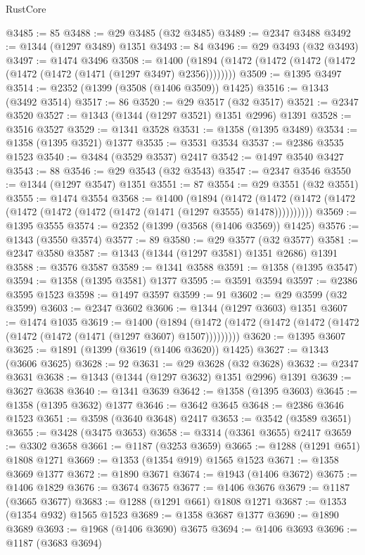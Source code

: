 \begin{lexlean}{RustCore}
\begin{coremodule}
@3485 := 85
@3488 := @29 @3485 (@32 @3485)
@3489 := @2347 @3488
@3492 := @1344 (@1297 @3489) @1351
@3493 := 84
@3496 := @29 @3493 (@32 @3493)
@3497 := @1474 @3496
@3508 := @1400 (@1894 (@1472 (@1472 (@1472 (@1472 (@1472 (@1472 (@1471 (@1297 @3497) @2356))))))))
@3509 := @1395 @3497
@3514 := @2352 (@1399 (@3508 (@1406 @3509)) @1425)
@3516 := @1343 (@3492 @3514)
@3517 := 86
@3520 := @29 @3517 (@32 @3517)
@3521 := @2347 @3520
@3527 := @1343 (@1344 (@1297 @3521) @1351 @2996) @1391
@3528 := @3516 @3527
@3529 := @1341 @3528
@3531 := @1358 (@1395 @3489)
@3534 := @1358 (@1395 @3521) @1377
@3535 := @3531 @3534
@3537 := @2386 @3535 @1523
@3540 := @3484 (@3529 @3537) @2417
@3542 := @1497 @3540 @3427
@3543 := 88
@3546 := @29 @3543 (@32 @3543)
@3547 := @2347 @3546
@3550 := @1344 (@1297 @3547) @1351
@3551 := 87
@3554 := @29 @3551 (@32 @3551)
@3555 := @1474 @3554
@3568 := @1400
    (@1894
      (@1472 (@1472 (@1472 (@1472 (@1472 (@1472 (@1472 (@1472 (@1471 (@1297 @3555) @1478))))))))))
@3569 := @1395 @3555
@3574 := @2352 (@1399 (@3568 (@1406 @3569)) @1425)
@3576 := @1343 (@3550 @3574)
@3577 := 89
@3580 := @29 @3577 (@32 @3577)
@3581 := @2347 @3580
@3587 := @1343 (@1344 (@1297 @3581) @1351 @2686) @1391
@3588 := @3576 @3587
@3589 := @1341 @3588
@3591 := @1358 (@1395 @3547)
@3594 := @1358 (@1395 @3581) @1377
@3595 := @3591 @3594
@3597 := @2386 @3595 @1523
@3598 := @1497 @3597
@3599 := 91
@3602 := @29 @3599 (@32 @3599)
@3603 := @2347 @3602
@3606 := @1344 (@1297 @3603) @1351
@3607 := @1474 @1035
@3619 := @1400
    (@1894 (@1472 (@1472 (@1472 (@1472 (@1472 (@1472 (@1472 (@1471 (@1297 @3607) @1507)))))))))
@3620 := @1395 @3607
@3625 := @1891 (@1399 (@3619 (@1406 @3620)) @1425)
@3627 := @1343 (@3606 @3625)
@3628 := 92
@3631 := @29 @3628 (@32 @3628)
@3632 := @2347 @3631
@3638 := @1343 (@1344 (@1297 @3632) @1351 @2996) @1391
@3639 := @3627 @3638
@3640 := @1341 @3639
@3642 := @1358 (@1395 @3603)
@3645 := @1358 (@1395 @3632) @1377
@3646 := @3642 @3645
@3648 := @2386 @3646 @1523
@3651 := @3598 (@3640 @3648) @2417
@3653 := @3542 (@3589 @3651)
@3655 := @3428 (@3475 @3653)
@3658 := @3314 (@3361 @3655) @2417
@3659 := @3302 @3658
@3661 := @1187 (@3253 @3659)
@3665 := @1288 (@1291 @651) @1808 @1271
@3669 := @1353 (@1354 @919) @1565 @1523
@3671 := @1358 @3669 @1377
@3672 := @1890 @3671
@3674 := @1943 (@1406 @3672)
@3675 := @1406 @1829
@3676 := @3674 @3675
@3677 := @1406 @3676
@3679 := @1187 (@3665 @3677)
@3683 := @1288 (@1291 @661) @1808 @1271
@3687 := @1353 (@1354 @932) @1565 @1523
@3689 := @1358 @3687 @1377
@3690 := @1890 @3689
@3693 := @1968 (@1406 @3690) @3675
@3694 := @1406 @3693
@3696 := @1187 (@3683 @3694)

\end{coremodule}
\end{lexlean}
